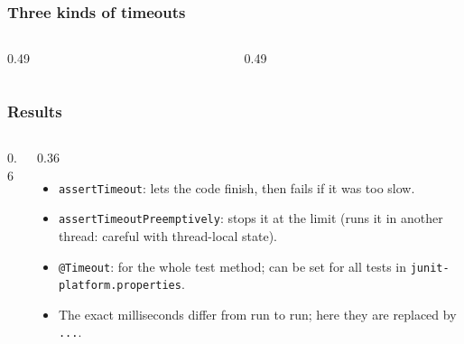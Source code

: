 \documentclass[aspectratio=169,10pt,compress]{beamer}
\begin{document}
\begin{frame}[t,fragile] \frametitle{Three kinds of timeouts}
  \begin{columns}[T]
    \begin{column}{0.49\textwidth}
    \end{column}
    \begin{column}{0.49\textwidth}
    \end{column}
  \end{columns}
\end{frame}




\begin{frame}[t,fragile] \frametitle{Results}
  \begin{columns}[T]
    \begin{column}{0.6\textwidth}
    \end{column}
    \begin{column}{0.36\textwidth}
      \begin{itemize}\small
        \item \texttt{assertTimeout}: lets the code finish, then fails if it was too slow.
        \item \texttt{assertTimeoutPreemptively}: stops it at the limit (runs it in another thread: careful with thread-local state).
        \item \texttt{@Timeout}: for the whole test method; can be set for all tests in \texttt{junit-platform.properties}.
        \item The exact milliseconds differ from run to run; here they are replaced by \texttt{...}.
      \end{itemize}
    \end{column}
  \end{columns}
\end{frame}

\end{document}
